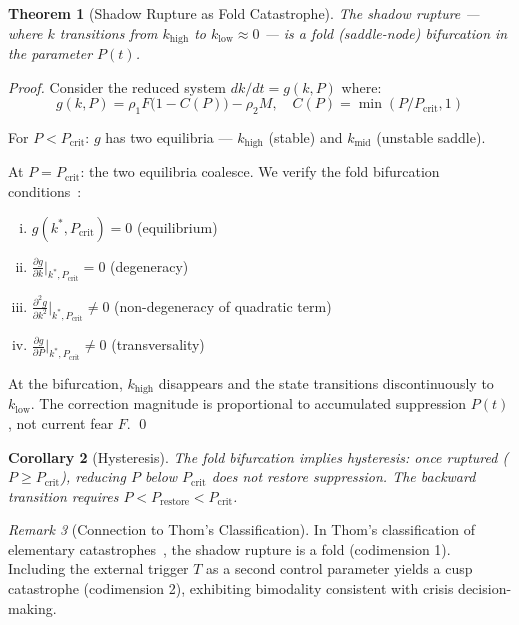 \documentclass[12pt,a4paper]{article}
\theoremstyle{plain}
\newtheorem{theorem}{Theorem}[section]
\newtheorem{corollary}[theorem]{Corollary}
\theoremstyle{definition}
\theoremstyle{remark}
\newtheorem{remark}[theorem]{Remark}
\newcommand{\Pcrit}{P_{\mathrm{crit}}}
\begin{document}
\begin{theorem}[Shadow Rupture as Fold Catastrophe]\label{thm:fold}
The shadow rupture --- where $k$ transitions from $k_{\mathrm{high}}$ to $k_{\mathrm{low}} \approx 0$ --- is a fold (saddle-node) bifurcation in the parameter $P(t)$.
\end{theorem}

\begin{proof}
Consider the reduced system $dk/dt = g(k, P)$ where:
\[
g(k, P) = \rho_1 F\bigl(1 - C(P)\bigr) - \rho_2 M, \quad C(P) = \min(P/\Pcrit, 1)
\]

For $P < \Pcrit$: $g$ has two equilibria --- $k_{\mathrm{high}}$ (stable) and $k_{\mathrm{mid}}$ (unstable saddle).

At $P = \Pcrit$: the two equilibria coalesce. We verify the fold bifurcation conditions~\cite{kuznetsov2004,strogatz2015}:
\begin{enumerate}[(i),nosep]
  \item $g(k^*, \Pcrit) = 0$ \quad (equilibrium)
  \item $\frac{\partial g}{\partial k}\big|_{k^*,\Pcrit} = 0$ \quad (degeneracy)
  \item $\frac{\partial^2 g}{\partial k^2}\big|_{k^*,\Pcrit} \neq 0$ \quad (non-degeneracy of quadratic term)
  \item $\frac{\partial g}{\partial P}\big|_{k^*,\Pcrit} \neq 0$ \quad (transversality)
\end{enumerate}
At the bifurcation, $k_{\mathrm{high}}$ disappears and the state transitions discontinuously to $k_{\mathrm{low}}$. The correction magnitude is proportional to accumulated suppression $P(t)$, not current fear $F$. \qed
\end{proof}

\begin{corollary}[Hysteresis]
The fold bifurcation implies hysteresis: once ruptured ($P \geq \Pcrit$), reducing $P$ below $\Pcrit$ does not restore suppression. The backward transition requires $P < P_{\mathrm{restore}} < \Pcrit$.
\end{corollary}

\begin{remark}[Connection to Thom's Classification]
In Thom's classification of elementary catastrophes~\cite{thom1972}, the shadow rupture is a fold (codimension 1). Including the external trigger $T$ as a second control parameter yields a cusp catastrophe (codimension 2), exhibiting bimodality consistent with crisis decision-making.
\end{remark}
\end{document}
